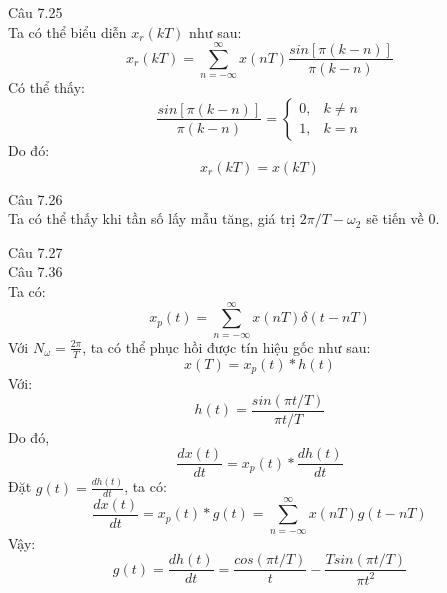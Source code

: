 \documentclass[11pt]{exam}
\begin{document}
\begin{questions}

\question Câu 7.25 \\
    Ta có thể biểu diễn $x_r(kT)$ như sau:
    \begin{equation*}
        x_r(kT) = \sum_{n=-\infty}^{\infty}{x(nT)\frac{sin\left[\pi(k-n)\right]}{\pi(k-n)}}
    \end{equation*}
    Có thể thấy:
    \begin{equation*}
        \frac{sin\left[\pi(k-n)\right]}{\pi(k-n)} = 
        \begin{cases}
            0, & k \neq n \\
            1, & k = n
        \end{cases}
    \end{equation*}
    Do đó:
    \begin{equation*}
        x_r(kT) = x(kT)
    \end{equation*}

\question Câu 7.26 \\
    Ta có thể thấy khi tần số lấy mẫu tăng, giá trị $2\pi/T - \omega_2$ sẽ tiến về 0.

\question Câu 7.27 \\
\question Câu 7.36 \\
    Ta có:
    \begin{equation*}
        x_p(t) = \sum_{n=-\infty}^{\infty}{x(nT)\delta(t - nT)}
    \end{equation*}
    Với $N_\omega =\frac{2\pi}{T}$, ta có thể phục hồi được tín hiệu gốc như sau:
    \begin{equation*}
        x(T) = x_p(t) \ast h(t)
    \end{equation*}
    Với:
    \begin{equation*}
        h(t) = \frac{sin(\pi t/T)}{\pi t/T}
    \end{equation*}
    Do đó,
    \begin{equation*}
        \frac{dx(t)}{dt}=x_p(t) \ast \frac{dh(t)}{dt}
    \end{equation*}
    Đặt $g(t) = \frac{dh(t)}{dt}$, ta có:
    \begin{equation*}
        \frac{dx(t)}{dt}=x_p(t) \ast g(t) = \sum_{n=-\infty}^{\infty}{x(nT)g(t - nT)}
    \end{equation*}
    Vậy:
    \begin{equation*}
        g(t) = \frac{dh(t)}{dt} = \frac{cos(\pi t/T)}{t} - \frac{Tsin(\pi t/T)}{\pi t^2}
    \end{equation*}

\end{questions}
\end{document}
